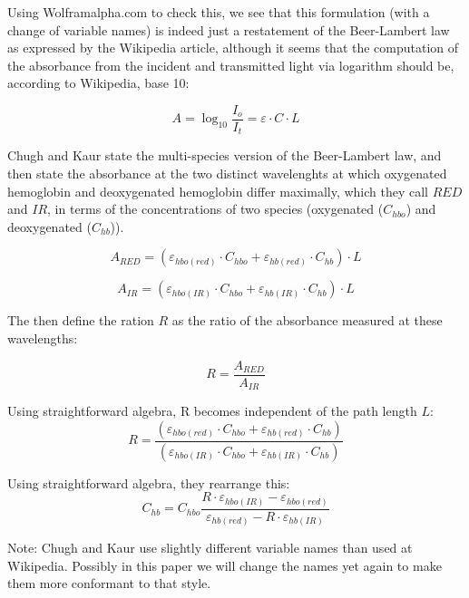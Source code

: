 \documentclass[11pt]{article}
\begin{document}
Using Wolframalpha.com to check this, we see that this formulation
(with a change of variable names)
is indeed just a restatement of the Beer-Lambert law as expressed by the
Wikipedia article\cite{wiki:Beer-Lambert}, although it seems that the computation
of the absorbance from the incident and transmitted light via 
logarithm should be, according to Wikipedia, base 10:

\begin{equation}
  A = \log_{10} \frac{I_o}{I_t} = \varepsilon \cdot C \cdot L
\end{equation}


Chugh and Kaur state the multi-species version of the Beer-Lambert law,
and then state the absorbance at the two distinct wavelenghts at which
oxygenated hemoglobin and deoxygenated hemoglobin differ maximally,
which they call $RED$ and $IR$, in terms of the concentrations of
two species (oxygenated ($C_{hbo}$) and
deoxygenated  ($C_{hb}$)).

\begin{equation}
  A_{RED} = (\varepsilon_{hbo(red)}\cdot C_{hbo} + \varepsilon_{hb(red)}\cdot C_{hb}) \cdot L
\end{equation}

\begin{equation}
  A_{IR} = (\varepsilon_{hbo(IR)}\cdot C_{hbo} + \varepsilon_{hb(IR)}\cdot C_{hb}) \cdot L
\end{equation}

The then define the ration $R$ as the ratio of the absorbance measured
at these wavelengths:

\begin{equation}
  R = \frac{A_{RED}}{A_{IR}}
  \end{equation}

Using straightforward algebra, R becomes independent of the path length $L$:
\begin{equation}
  R = \frac{(\varepsilon_{hbo(red)}\cdot C_{hbo} + \varepsilon_{hb(red)}\cdot C_{hb})}{(\varepsilon_{hbo(IR)}\cdot C_{hbo} + \varepsilon_{hb(IR)}\cdot C_{hb})}
\end{equation}

Using straightforward algebra, they rearrange this:
\begin{equation}
  \label{eq:chb}
  C_{hb} = C_{hbo} \frac{R \cdot \varepsilon_{hbo(IR)} - \varepsilon_{hbo(red)}}
  {\varepsilon_{hb(red)} - R \cdot \varepsilon_{hb(IR)} }
\end{equation}

Note: Chugh and Kaur use slightly different variable names than used at Wikipedia.
Possibly in this paper we will change the names yet again to make them more
conformant to that style.
\end{document}
